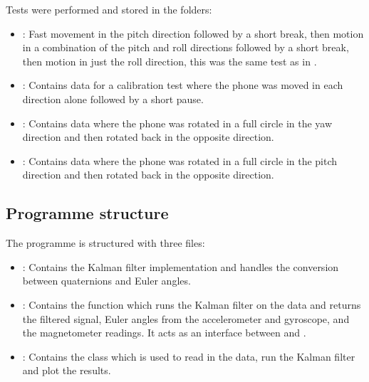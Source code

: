 \documentclass[letterpaper,10pt,english]{jupyterBook}
\begin{document}
\sphinxAtStartPar
Tests were performed and stored in the folders:
\begin{itemize}
\item {} 
\sphinxAtStartPar
{}: Fast movement in the pitch direction followed by a short break, then motion in a combination of the pitch and roll directions followed by a short break, then motion in just the roll direction, this was the same test as in {\hyperref[\detokenize{5IMU::doc}]{}}.

\item {} 
\sphinxAtStartPar
{}: Contains data for a calibration test where the phone was moved in each direction alone followed by a short pause.

\item {} 
\sphinxAtStartPar
{}: Contains data where the phone was rotated in a full circle in the yaw direction and then rotated back in the opposite direction.

\item {} 
\sphinxAtStartPar
{}: Contains data where the phone was rotated in a full circle in the pitch direction and then rotated back in the opposite direction.

\end{itemize}


\subsection{Programme structure}
\label{\detokenize{7RealData:programme-structure}}
\sphinxAtStartPar
The programme is structured with three files:
\begin{itemize}
\item {} 
\sphinxAtStartPar
{}: Contains the Kalman filter implementation and handles the conversion between quaternions and Euler angles.

\item {} 
\sphinxAtStartPar
{}: Contains the  function which runs the Kalman filter on the data and returns the filtered signal, Euler angles from the accelerometer and gyroscope, and the magnetometer readings. It acts as an interface between  and .

\item {} 
\sphinxAtStartPar
{}: Contains the  class which is used to read in the data, run the Kalman filter and plot the results.

\end{itemize}
\end{document}
